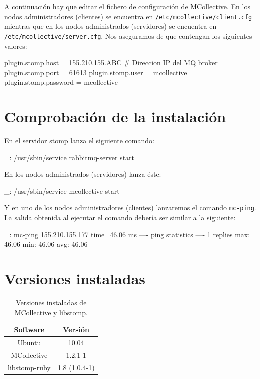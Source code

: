 A continuación hay que editar el fichero de configuración de MCollective. En los nodos administradores (clientes) se encuentra en \texttt{/etc/mcollective/client.cfg} mientras que en los nodos administrados (servidores) se encuentra en \texttt{/etc/mcollective/server.cfg}. Nos aseguramos de que contengan los siguientes valores:

\begin{bashcode}
plugin.stomp.host = 155.210.155.ABC # Direccion IP del MQ broker
plugin.stomp.port = 61613
plugin.stomp.user = mcollective
plugin.stomp.password = mcollective
\end{bashcode}


\section{Comprobación de la instalación}

En el servidor stomp lanza el siguiente comando:

\begin{bashcode}
_: /usr/sbin/service rabbitmq-server start
\end{bashcode}

En los nodos administrados (servidores) lanza éste:

\begin{bashcode}
_: /usr/sbin/service mcollective start
\end{bashcode}

Y en uno de los nodos administradores (clientes) lanzaremos el comando \texttt{mc-ping}. La salida obtenida al ejecutar el comando debería ser similar a la siguiente:

\begin{bashcode}
_: mc-ping
155.210.155.177                       time=46.06 ms
---- ping statistics ----
1 replies max: 46.06 min: 46.06 avg: 46.06
\end{bashcode}


\section{Versiones instaladas}

\begin{table}[!htbp]
\centering
   \begin{tabular}{|c|c|}
      \hline
      \textbf{Software} & \textbf{Versión} \\ \hline
      Ubuntu & 10.04 \\ \hline
      MCollective & 1.2.1-1 \\ \hline
      libstomp-ruby & 1.8 (1.0.4-1) \\ \hline
   \end{tabular}
\caption{Versiones instaladas de MCollective y libstomp.}
\label{table:mcollective-versions}
\end{table}
